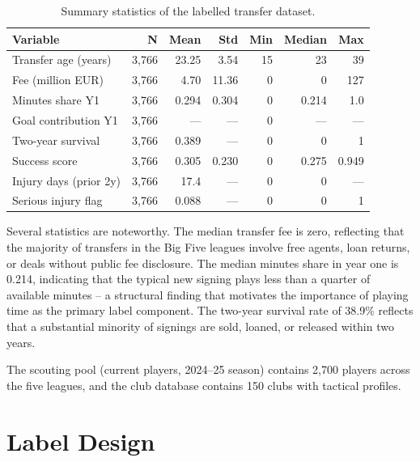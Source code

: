 \documentclass[12pt, a4paper, oneside]{report}
\begin{document}
\begin{table}[H]
\centering
\caption{Summary statistics of the labelled transfer dataset.}
\label{tab:dataset_stats}
\begin{tabular}{lrrrrrr}
\toprule
\textbf{Variable} & \textbf{N} & \textbf{Mean} & \textbf{Std} & \textbf{Min} & \textbf{Median} & \textbf{Max} \\
\midrule
Transfer age (years)     & 3,766 & 23.25 & 3.54  & 15  & 23    & 39  \\
Fee (million EUR)        & 3,766 & 4.70  & 11.36 & 0   & 0     & 127 \\
Minutes share Y1         & 3,766 & 0.294 & 0.304 & 0   & 0.214 & 1.0 \\
Goal contribution Y1     & 3,766 & ---   & ---   & 0   & ---   & --- \\
Two-year survival        & 3,766 & 0.389 & ---   & 0   & 0     & 1   \\
Success score            & 3,766 & 0.305 & 0.230 & 0   & 0.275 & 0.949 \\
Injury days (prior 2y)   & 3,766 & 17.4  & ---   & 0   & 0     & ---  \\
Serious injury flag      & 3,766 & 0.088 & ---   & 0   & 0     & 1   \\
\bottomrule
\end{tabular}
\end{table}

Several statistics are noteworthy. The median transfer fee is zero, reflecting that the majority of transfers in the Big Five leagues involve free agents, loan returns, or deals without public fee disclosure. The median minutes share in year one is 0.214, indicating that the typical new signing plays less than a quarter of available minutes -- a structural finding that motivates the importance of playing time as the primary label component. The two-year survival rate of 38.9\% reflects that a substantial minority of signings are sold, loaned, or released within two years.

The scouting pool (current players, 2024--25 season) contains 2,700 players across the five leagues, and the club database contains 150 clubs with tactical profiles.

\chapter{Label Design}
\label{chap:labels}
\end{document}
